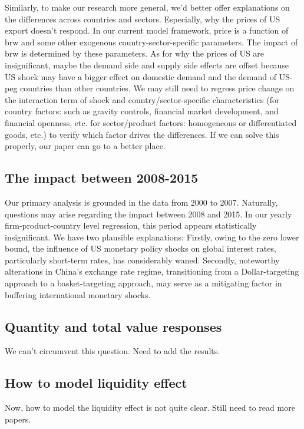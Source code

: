 \documentclass[12pt]{article}
\begin{document}
Similarly, to make our research more general, we'd better offer explanations on the differences across countries and sectors. Especially, why the prices of US export doesn't respond. In our current model framework, price is a function of brw and some other exogenous country-sector-specific parameters. The impact of brw is determined by these parameters. As for why the prices of US are insignificant, maybe the demand side and supply side effects are offset because US shock may have a bigger effect on domestic demand and the demand of US-peg countries than other countries. We may still need to regress price change on the interaction term of shock and country/sector-specific characteristics (for country factors: such as gravity controls, financial market development, and financial openness, etc. for sector/product factors: homogeneous or differentiated goods, etc.) to verify which factor drives the differences. 
If we can solve this properly, our paper can go to a better place.

\subsection{The impact between 2008-2015}
Our primary analysis is grounded in the data from 2000 to 2007. Naturally, questions may arise regarding the impact between 2008 and 2015. In our yearly firm-product-country level regression, this period appears statistically insignificant. We have two plausible explanations: Firstly, owing to the zero lower bound, the influence of US monetary policy shocks on global interest rates, particularly short-term rates, has considerably waned. Secondly, noteworthy alterations in China's exchange rate regime, transitioning from a Dollar-targeting approach to a basket-targeting approach, may serve as a mitigating factor in buffering international monetary shocks.

\subsection{Quantity and total value responses}
We can't circumvent this question. Need to add the results.

\subsection{How to model liquidity effect}
Now, how to model the liquidity effect is not quite clear. Still need to read more papers.


\newpage

\end{document}
